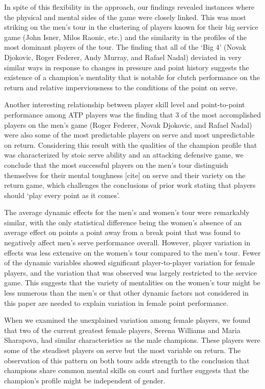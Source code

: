 \documentclass{Latex/svjour3}
\begin{document}
In spite of this flexibility in the approach, our findings revealed instances
where the physical and mental sides of the game were closely linked. This was
most striking on the men's tour in the clustering of players known for their big
service game (John Isner, Milos Raonic, etc.) and the similarity in the profiles
of the most dominant players of the tour. The finding that all of the `Big 4'
(Novak Djokovic, Roger Federer, Andy Murray, and Rafael Nadal) deviated in very
similar ways in response to changes in pressure and point history suggests the
existence of a champion's mentality that is notable for clutch performance on
the return and relative imperviousness to the conditions of the point on serve.

Another interesting relationship between player skill level and point-to-point
performance among ATP players was the finding that 3 of the most accomplished
players on the men's game (Roger Federer, Novak Djokovic, and Rafael Nadal) were
also some of the most predictable players on serve and most unpredictable on
return. Considering this result with the qualities of the champion profile that
was characterized by stoic serve ability and an attacking defensive game, we
conclude that the most successful players on the men's tour distinguish
themselves for their mental toughness [cite] on serve and their variety on the
return game, which challenges the conclusions of prior work stating that players
should `play every point as it comes'\cite{klaassen2001points}.

The average dynamic effects for the men's and women's tour were remarkably
similar, with the only statistical difference being the women's absence of an
average effect on points a point away from a break point that was found to
negatively affect men's serve performance overall. However, player variation in
effects was less extensive on the women's tour compared to the men's tour. Fewer
of the dynamic variables showed significant player-to-player variation for
female players, and the variation that was observed was largely restricted to
the service game. This suggests that the variety of mentalities on the women's
tour might be less numerous than the men's or that other dynamic factors not
considered in this paper are needed to explain variation in female point
performance.

When we examined the unexplained variation among female players, we found that
two of the current greatest female players, Serena Williams and Maria Sharapova,
had similar characteristics as the male champions. These players were some of
the steadiest players on serve but the most variable on return. The observation
of this pattern on both tours adds strength to the conclusion that champions
share common mental skills on court and further suggests that the champion's
profile might be independent of gender.
\end{document}
